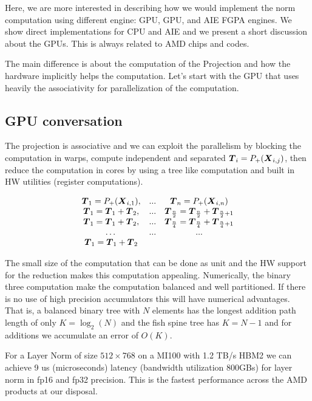 \documentclass[acmsmall]{acmart}
\begin{document}
Here, we are more interested in describing how we would implement the
norm computation using different engine: GPU, GPU, and AIE FGPA
engines. We show direct implementations for CPU and AIE and we present
a short discussion about the GPUs. This is always related to AMD chips
and codes.

The main difference is about the computation of the Projection and how
the hardware implicitly helps the computation. Let's start with the
GPU that uses heavily the associativity for parallelization of the
computation.

\subsection{GPU conversation}
The projection is associative and we can exploit the parallelism by
blocking the computation in warps, compute independent and separated
${\boldsymbol T}_i = P_+({\boldsymbol X}_{i,j})$, then reduce the computation in cores
by using a tree like computation and built in HW utilities (register
computations). 

\begin{equation}
  \begin{matrix}
    {\boldsymbol T}_1 = P_+({\boldsymbol X}_{i,1}), & ... &  {\boldsymbol T}_n = P_+({\boldsymbol X}_{i,n}) \\ 
    {\boldsymbol T}_1 = {\boldsymbol T}_1+{\boldsymbol T}_2, & ... &  {\boldsymbol T}_{\frac{n}{2}} = {\boldsymbol T}_{\frac{n}{2}} + {\boldsymbol T}_{\frac{n}{2}+1} \\
    {\boldsymbol T}_1 = {\boldsymbol T}_1 + {\boldsymbol T}_2, & ... &  {\boldsymbol T}_{\frac{n}{4}} = {\boldsymbol T}_{\frac{n}{4}} + {\boldsymbol T}_{\frac{n}{4}+1} \\
    \dots  & ... & ... \\ 
    {\boldsymbol T}_1 = {\boldsymbol T}_1 + {\boldsymbol T}_2 & & \\
  \end{matrix}
\end{equation}

The small size of the computation that can be done as unit and the HW
support for the reduction makes this computation
appealing. Numerically, the binary three computation make the
computation balanced and well partitioned. If there is no use of high
precision accumulators this will have numerical advantages. That is, a
balanced binary tree with $N$ elements has the longest addition path
length of only $K = \log_2(N)$ and the fish spine tree has $K = N-1$
and for additions we accumulate an error of $O(K)$. 

For a Layer Norm of size $512 \times 768$ on a MI100 with 1.2 TB/s
HBM2 we can achieve 9 us (microseconds) latency (bandwidth utilization
800GBs) for layer norm in fp16 and fp32 precision. This is the fastest
performance across the AMD products at our disposal.
\end{document}
